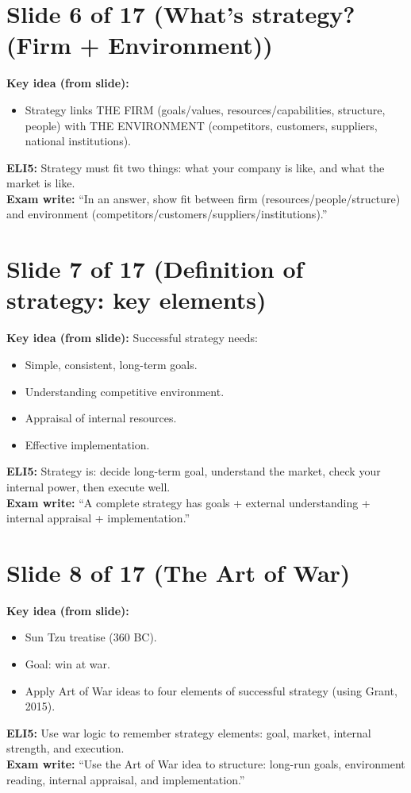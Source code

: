 \documentclass[11pt,a4paper]{article}
\begin{document}
\section*{Slide 6 of 17 (What’s strategy? (Firm + Environment)) }
\textbf{Key idea (from slide):}
\begin{itemize}
  \item Strategy links THE FIRM (goals/values, resources/capabilities, structure, people) with THE ENVIRONMENT (competitors, customers, suppliers, national institutions).
\end{itemize}
\textbf{ELI5:} Strategy must fit two things: what your company is like, and what the market is like.\\
\textbf{Exam write:} ``In an answer, show fit between firm (resources/people/structure) and environment (competitors/customers/suppliers/institutions).''

\section*{Slide 7 of 17 (Definition of strategy: key elements)}
\textbf{Key idea (from slide):} Successful strategy needs:
\begin{itemize}
  \item Simple, consistent, long-term goals.
  \item Understanding competitive environment.
  \item Appraisal of internal resources.
  \item Effective implementation.
\end{itemize}
\textbf{ELI5:} Strategy is: decide long-term goal, understand the market, check your internal power, then execute well.\\
\textbf{Exam write:} ``A complete strategy has goals + external understanding + internal appraisal + implementation.''

\section*{Slide 8 of 17 (The Art of War)}
\textbf{Key idea (from slide):}
\begin{itemize}
  \item Sun Tzu treatise (360 BC).
  \item Goal: win at war.
  \item Apply Art of War ideas to four elements of successful strategy (using Grant, 2015).
\end{itemize}
\textbf{ELI5:} Use war logic to remember strategy elements: goal, market, internal strength, and execution.\\
\textbf{Exam write:} ``Use the Art of War idea to structure: long-run goals, environment reading, internal appraisal, and implementation.''
\end{document}
